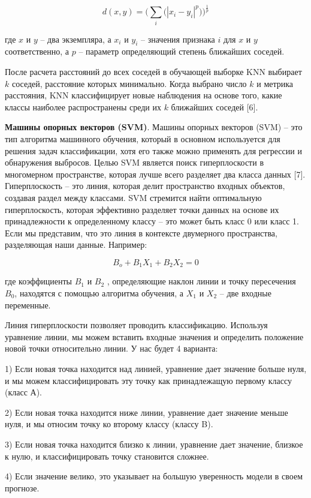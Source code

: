 \begin{equation}
	d(x,y)=\Bigg(\sum_{i} \bigg(|x_i - y_i|^p \bigg)\Bigg)^\frac{1}{p}
\end{equation}
\begin{multicols}{2}

где $x $ и $y $ -- два экземпляра, а $x_i$ и $y_i$ -- значения признака $i$ для $x$ и $y$
соответственно, а $p$ -- параметр определяющий степень ближайших соседей.

После расчета расстояний до всех соседей в обучающей выборке KNN
выбирает $k$ соседей, расстояние которых
минимально. Когда выбрано число $k$ и метрика расстояния, KNN классифицирует новые наблюдения на основе того,
какие классы наиболее распространены среди их $k$ ближайших соседей {[}6{]}.

{\bfseries Машины опорных векторов (SVM)}. Машины опорных векторов (SVM) --
это тип алгоритма машинного обучения, который в основном используется
для решения задач классификации, хотя его также можно применять для
регрессии и обнаружения выбросов. Целью SVM является поиск гиперплоскости в многомерном пространстве, которая лучше всего разделяет
два класса данных {[}7{]}.\\ Гиперплоскость -- это линия, которая делит
пространство входных объектов, создавая раздел между классами. SVM
стремится найти оптимальную гиперплоскость, которая эффективно разделяет
точки данных на основе их принадлежности к определенному классу -- это
может быть класс 0 или класс 1. Если мы представим, что это линия в
контексте двумерного пространства, разделяющая наши данные. Например:
\end{multicols}

\begin{equation}
	B_o+B_1X_1+B_2X_2=0
\end{equation}
\begin{multicols}{2}

где коэффициенты $B_1$ и $B_2$ , определяющие наклон линии и точку
пересечения $B_0$, находятся с помощью алгоритма обучения, а $X_1$ и $X_2$ -- две входные переменные.

Линия гиперплоскости позволяет проводить классификацию. Используя
уравнение линии, мы можем вставить входные значения и определить
положение новой точки относительно линии. У нас будет 4 варианта:

1) Если новая точка находится над линией, уравнение дает значение больше
нуля, и мы можем классифицировать эту точку как принадлежащую первому
классу (класс А).

2) Если новая точка находится ниже линии, уравнение дает значение меньше
нуля, и мы относим точку ко второму классу (классу B).

3) Если новая точка находится близко к линии, уравнение дает значение,
близкое к нулю, и классифицировать точку становится сложнее.

4) Если значение велико, это указывает на большую уверенность модели в
своем прогнозе.

\end{multicols}

